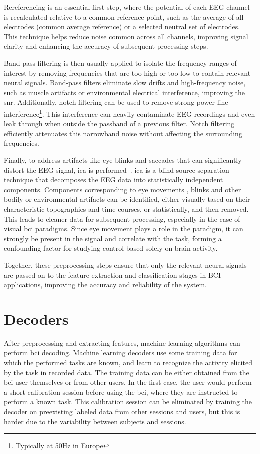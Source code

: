 Rereferencing is an essential first step, where the potential of each EEG channel is
recalculated relative to a common reference point, such as the average of all
electrodes (common average reference) or a selected neutral set of electrodes.
This technique helps reduce noise common across all channels, improving signal clarity
and enhancing the accuracy of subsequent processing steps.

Band-pass filtering is then usually applied to isolate the frequency ranges of interest by
removing frequencies that are too high or too low to contain relevant neural signals.
Band-pass filters eliminate slow drifts and high-frequency noise, such as
muscle artifacts or environmental electrical interference, improving the
\ac{snr}.
Additionally, notch filtering can be  used to remove strong power line
interference\footnote{Typically at 50Hz in Europe}.
This interference can heavily contaminate EEG recordings and even leak through
when outside the passband of a previous filter.
Notch filtering efficiently attenuates this narrowband noise without affecting
the surrounding frequencies.

Finally, to address artifacts like eye blinks and saccades that can significantly
distort the EEG signal, \ac{ica} is
performed~\cite{Delorme2007}.
\Ac{ica} is a blind source separation technique that decomposes the EEG data into
statistically independent components. Components corresponding to eye movements
, blinks and other bodily or environmental artifacts can be identified, either
visually tased on their characteristic topographies and time courses, or
statistically, and then removed.
This leads to cleaner data for subsequent processing, especially in the case of
visual \ac{bci} paradigms.
Since eye movement plays a role in the paradigm, it can strongly be present in
the signal and correlate with the task, forming a confounding factor for
studying control based solely on brain activity.

Together, these preprocessing steps ensure that only the relevant neural signals are
passed on to the feature extraction and classification stages in BCI applications,
improving the accuracy and reliability of the system.

\section{Decoders}%
\label{sec:bci/decoding}

After preprocessing and extracting features, machine learning algorithms can perform \ac{bci}
decoding.
Machine learning decoders use some training data for which the performed tasks
are known, and learn to recognize the activity elicited by the task in recorded data.
The training data can be either obtained from the \ac{bci} user themselves or from
other users.
In the first case, the user would perform a short calibration session before
using the \ac{bci}, where they are instructed to perform a known task.
This calibration session can be eliminated by training the decoder on
preexisting labeled data from other sessions and users, but this is harder due
to the variability between subjects and sessions.

